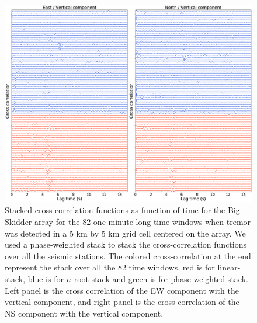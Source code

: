 \documentclass[draft]{agujournal2019}
\begin{document}
\begin{figure}
\noindent\includegraphics[width=\textwidth, trim={5cm 2cm 5cm 3.5cm},clip]{figures/BS_000_000_PWS_PWS_cluster_ccwin.eps}
\caption{Stacked cross correlation functions as function of time for the Big Skidder array for the 82 one-minute long time windows when tremor was detected in a 5 km by 5 km grid cell centered on the array. We used a phase-weighted stack to stack the cross-correlation functions over all the seismic stations. The colored cross-correlation at the end represent the stack over all the 82 time windows, red is for linear-stack, blue is for $n$-root stack and green is for phase-weighted stack. Left panel is the cross correlation of the EW component with the vertical component, and right panel is the cross correlation of the NS component with the vertical component.}
\label{pngfiguresample}
\end{figure}
\end{document}

